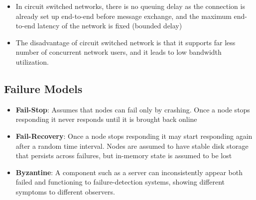 \documentclass{article}
\begin{document}
\begin{itemize}
    \item In circuit switched networks, there is no queuing delay as the connection is already set up end-to-end before message exchange, and the maximum end-to-end latency of the network is fixed (bounded delay)
    
    \item The disadvantage of circuit switched network is that it supports far less number of concurrent network users, and it leads to low bandwidth utilization. 
\end{itemize}

\subsection{Failure Models}
\begin{itemize}
    \item \textbf{Fail-Stop}: Assumes that nodes can fail only by crashing. Once a node stops responding it never responds until it is brought back online
    
    \item \textbf{Fail-Recovery}: Once a node stops responding it may start responding again after a random time interval. Nodes are assumed to have stable disk storage that persists across failures, but in-memory state is assumed to be lost
    
    \item \textbf{Byzantine}: A component such as a server can inconsistently appear both failed and functioning to failure-detection systems, showing different symptoms to different observers.
\end{itemize}
\end{document}
